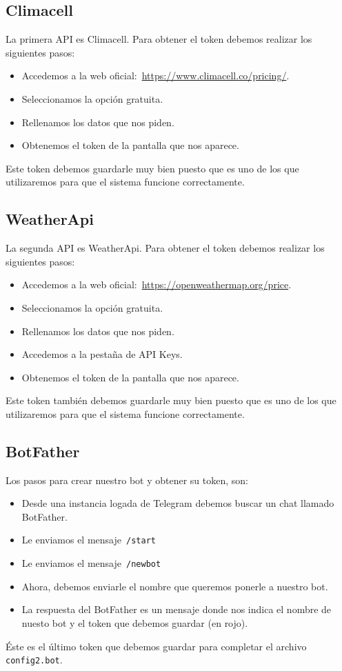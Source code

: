 \subsection{Climacell}
La primera API es Climacell. Para obtener el token debemos realizar los siguientes pasos:
\begin{itemize}
    \item Accedemos a la web oficial:~\url{https://www.climacell.co/pricing/}.
    \item Seleccionamos la opción gratuita.
    \item Rellenamos los datos que nos piden.
    \item Obtenemos el token de la pantalla que nos aparece.
\end{itemize}
Este token debemos guardarle muy bien puesto que es uno de los que utilizaremos para que el sistema funcione correctamente.

\subsection{WeatherApi}
La segunda API es WeatherApi. Para obtener el token debemos realizar los siguientes pasos:
\begin{itemize}
    \item Accedemos a la web oficial:~\url{https://openweathermap.org/price}.
    \item Seleccionamos la opción gratuita.
    \item Rellenamos los datos que nos piden.
    \item Accedemos a la pestaña de API Keys.
    \item Obtenemos el token de la pantalla que nos aparece.
\end{itemize}
Este token también debemos guardarle muy bien puesto que es uno de los que utilizaremos para que el sistema funcione correctamente.

\subsection{BotFather}
Los pasos para crear nuestro bot y obtener su token, son:
\begin{itemize}
    \item Desde una instancia logada de Telegram debemos buscar un chat llamado BotFather.
    \item Le enviamos el mensaje~\texttt{/start}
    \item Le enviamos el mensaje~\texttt{/newbot}
    \item Ahora, debemos enviarle el nombre que queremos ponerle a nuestro bot.
    \item La respuesta del BotFather es un mensaje donde nos indica el nombre de nuesto bot y el token que debemos guardar (en rojo).
\end{itemize}
Éste es el último token que debemos guardar para completar el archivo \texttt{config2.bot}.

